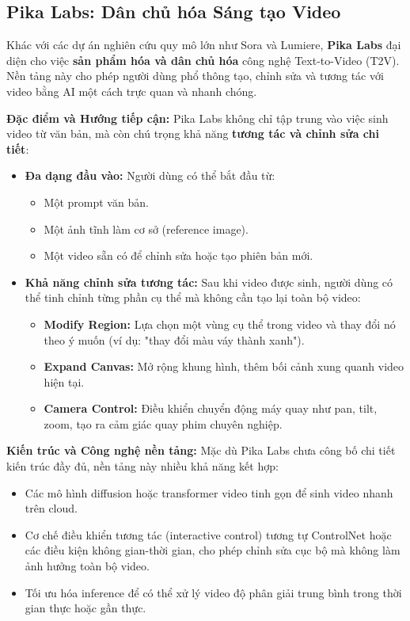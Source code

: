 \subsection{Pika Labs: Dân chủ hóa Sáng tạo Video}
\label{subsec:pika_labs}

Khác với các dự án nghiên cứu quy mô lớn như Sora và Lumiere, \textbf{Pika Labs} đại diện cho việc \textbf{sản phẩm hóa và dân chủ hóa} công nghệ Text-to-Video (T2V). Nền tảng này cho phép người dùng phổ thông tạo, chỉnh sửa và tương tác với video bằng AI một cách trực quan và nhanh chóng.

\textbf{Đặc điểm và Hướng tiếp cận:}  
Pika Labs không chỉ tập trung vào việc sinh video từ văn bản, mà còn chú trọng khả năng \textbf{tương tác và chỉnh sửa chi tiết}:

\begin{itemize}
	\item \textbf{Đa dạng đầu vào:} Người dùng có thể bắt đầu từ:
	\begin{itemize}
		\item Một prompt văn bản.
		\item Một ảnh tĩnh làm cơ sở (reference image).
		\item Một video sẵn có để chỉnh sửa hoặc tạo phiên bản mới.
	\end{itemize}
	
	\item \textbf{Khả năng chỉnh sửa tương tác:} Sau khi video được sinh, người dùng có thể tinh chỉnh từng phần cụ thể mà không cần tạo lại toàn bộ video:
	\begin{itemize}
		\item \textbf{Modify Region:} Lựa chọn một vùng cụ thể trong video và thay đổi nó theo ý muốn (ví dụ: "thay đổi màu váy thành xanh").
		\item \textbf{Expand Canvas:} Mở rộng khung hình, thêm bối cảnh xung quanh video hiện tại.
		\item \textbf{Camera Control:} Điều khiển chuyển động máy quay như pan, tilt, zoom, tạo ra cảm giác quay phim chuyên nghiệp.
	\end{itemize}
\end{itemize}

\textbf{Kiến trúc và Công nghệ nền tảng:}  
Mặc dù Pika Labs chưa công bố chi tiết kiến trúc đầy đủ, nền tảng này nhiều khả năng kết hợp:
\begin{itemize}
	\item Các mô hình diffusion hoặc transformer video tinh gọn để sinh video nhanh trên cloud.
	\item Cơ chế điều khiển tương tác (interactive control) tương tự ControlNet hoặc các điều kiện không gian-thời gian, cho phép chỉnh sửa cục bộ mà không làm ảnh hưởng toàn bộ video.
	\item Tối ưu hóa inference để có thể xử lý video độ phân giải trung bình trong thời gian thực hoặc gần thực.
\end{itemize}

